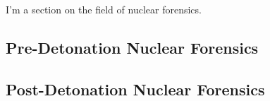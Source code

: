 I'm a section on the field of nuclear forensics.

\subsection{Pre-Detonation Nuclear Forensics}


\subsection{Post-Detonation Nuclear Forensics}


